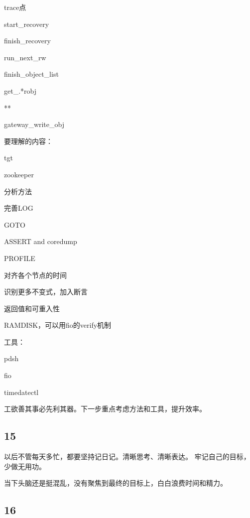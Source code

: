 trace点
\begin{enumbox}
\item start\_recovery
\item finish\_recovery
\item run\_next\_rw
\item finish\_object\_list
\item get\_.*robj
\item ***
\item gateway\_write\_obj
\end{enumbox}

要理解的内容：
\begin{enumbox}
\item tgt
\item zookeeper
\end{enumbox}

分析方法
\begin{enumbox}
\item 完善LOG
\item GOTO
\item ASSERT and coredump
\item PROFILE
\item 对齐各个节点的时间
\item 识别更多不变式，加入断言
\item 返回值和可重入性
\item RAMDISK，可以用fio的verify机制
\end{enumbox}

工具：
\begin{enumbox}
\item pdsh
\item fio
\item timedatectl
\end{enumbox}

工欲善其事必先利其器。下一步重点考虑方法和工具，提升效率。

\subsection{15}

以后不管每天多忙，都要坚持记日记。清晰思考、清晰表达。
牢记自己的目标，少做无用功。

当下头脑还是挺混乱，没有聚焦到最终的目标上，白白浪费时间和精力。

\subsection{16}

